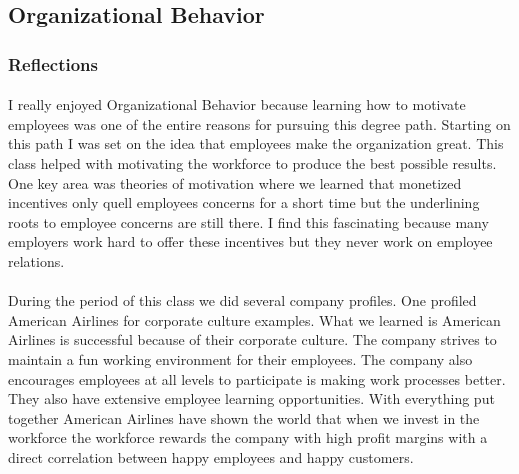 \documentclass[12pt,titlepage]{article}
\begin{document}

\restoregeometry



\restoregeometry



\subsection{Organizational Behavior}
\subsubsection{Reflections}
\paragraph {}
I really enjoyed Organizational Behavior because learning how to motivate employees was one of the entire reasons for pursuing this degree path. Starting on this path I was set on the idea that employees make the organization great. This class helped with motivating the workforce to produce the best possible results. One key area was theories of motivation where we learned that monetized incentives only quell employees concerns for a short time but the underlining roots to employee concerns are still there. I find this fascinating because many employers work hard to offer these incentives but they never work on employee relations.
\paragraph {}
During the period of this class we did several company profiles. One profiled American Airlines for corporate culture examples. What we learned is American Airlines is successful because of their corporate culture. The company strives to maintain a fun working environment for their employees. The company also encourages employees at all levels to participate is making work processes better. They also have extensive employee learning opportunities. With everything put together American Airlines have shown the world that when we invest in the workforce the workforce rewards the company with high profit margins with a direct correlation between happy employees and happy customers.
\end{document}
